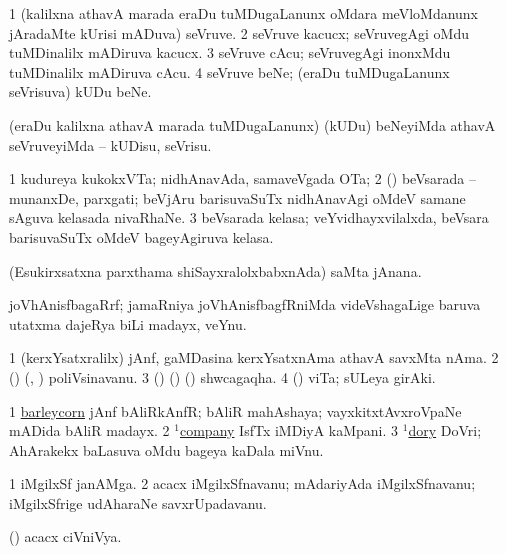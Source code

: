 \bentry
{}
\gl{\nA}
\bmng
\bnum
\num{1} (kalilxna athavA marada eraDu tuMDugaLanunx oMdara meVloMdanunx jAradaMte kUrisi mADuva) seVruve. 
\num{2} seVruve kacucx; seVruvegAgi oMdu tuMDinalilx mADiruva kacucx. 
\num{3} seVruve cAcu; seVruvegAgi inonxMdu tuMDinalilx mADiruva cAcu. 
\num{4} seVruve beNe; (eraDu tuMDugaLanunx seVrisuva) kUDu beNe. 
\enum
\emng
\eentry

\bentry
{}
\gl{\sakirx}
\bmng
(eraDu kalilxna athavA marada tuMDugaLanunx) (kUDu) beNeyiMda athavA seVruveyiMda -- kUDisu, seVrisu. 
\emng
\eentry

\bentry
{}
\gl{\nA}
\bmng
\bnum
\num{1} kudureya kukokxVTa; nidhAnavAda, samaveVgada OTa; 
\num{2} (\rUpa) beVsarada -- munanxDe, parxgati; beVjAru barisuvaSuTx nidhAnavAgi oMdeV samane sAguva kelasada nivaRhaNe. 
\num{3} beVsarada kelasa; veYvidhayxvilalxda, beVsara barisuvaSuTx oMdeV bageyAgiruva kelasa. 
\enum
\emng
\eentry

\bentry
{}
\gl{\gu}
\bmng
(Esukirxsatxna parxthama shiSayxralolxbabxnAda) saMta jAnana. 
\emng
\eentry

\bentry
{}
\gl{\nA}
\bmng
joVhAnisfbagaRrf; jamaRniya joVhAnisfbagfRniMda videVshagaLige baruva utatxma dajeRya biLi madayx, veYnu. 
\emng
\eentry

\bentry
{}
\gl{\nA}
\bmng
\bnum
\num{1} (kerxYsatxralilx) jAnf, gaMDasina kerxYsatxnAma athavA savxMta nAma. 
\num{2} () (\ashi, \hiV) poliVsinavanu. 
\num{3} () (\ame) (\ashi) shwcagaqha. 
\num{4} (\ashi) viTa; sULeya girAki. 
\enum
\emng

\noindent
\gl{\pagu}
\bmng
\bnum
\num{1}  \hyperref{kandict_b.pdf}{B}{barleycorn pagu}{barleycorn} jAnf bAliRkAnfR; bAliR mahAshaya; vayxkitxtAvxroVpaNe mADida bAliR madayx. 
\num{2}  \hyperref{kandict_c.pdf}{C}{company(1) pagu(1)}{$^1$company} IsfTx iMDiyA kaMpani. 
\num{3}  \hyperref{kandict_d.pdf}{D}{dory(1) pagu}{$^1$dory} DoVri; AhArakekx baLasuva oMdu bageya kaDala miVnu. 
\enum
\emng
\eentry

\bentry
{}
\gl{\nA}
\bmng
\bnum
\num{1} iMgilxSf janAMga. 
\num{2} acacx iMgilxSfnavanu; mAdariyAda iMgilxSfnavanu; iMgilxSfrige udAharaNe savxrUpadavanu. 
\enum
\emng
\eentry

\bentry
{}
\gl{\nA}
\bmng
(\hiV) acacx ciVniVya. 
\emng
\eentry

